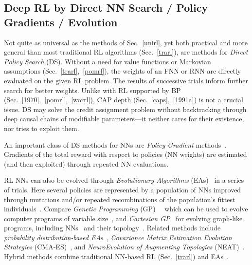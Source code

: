 \documentclass[letterpaper]{article}
\begin{document}
\begin{CJK*}{UTF8}{gbsn}
\subsection{Deep RL by Direct NN Search / Policy Gradients / Evolution}
\label{evorl}

Not quite as universal as the methods of Sec.~\ref{unirl},
yet both practical and more general than most traditional RL algorithms (Sec.~\ref{trarl}), are 
methods for {\em Direct Policy Search} (DS).
Without a need for value functions or Markovian assumptions (Sec.~\ref{trarl},~\ref{pomrl}), 
the weights of an FNN or RNN are directly evaluated on the given RL problem.
The results of successive trials inform further search for better weights.
Unlike with RL supported by BP (Sec.~\ref{1970},~\ref{pomrl},~\ref{worrl}),
CAP depth (Sec.~\ref{caps},~\ref{1991a}) is not a crucial issue.
DS may solve the credit assignment problem without 
backtracking through deep causal chains of 
modifiable parameters---it neither cares for their existence,
nor tries to exploit them.


An important class of DS methods for NNs are 
{\em Policy Gradient}
methods~\citep{Williams:86,Williams:88,Williams:92,Sutton:99,baxter2001,aberdeenthesis,ghavamzadehICML03,stoneICRA04,wierstraCEC08,rueckstiess2008b,peters2008neuralnetworks,peters2008neurocomputing,sehnke2009parameter,gruettner2010multi,wierstra2010,peters2010,grondman2012,heess2012}.
Gradients of the total reward with respect to policies (NN weights) are 
estimated (and then exploited) through repeated NN evaluations.

RL NNs can also be evolved through
{\em Evolutionary Algorithms} (EAs)~\citep{Rechenberg:71,Schwefel:74,Holland:75,Fogel:66,goldberg:gabook89}
 in a series of trials.
Here several policies are represented by a population
of NNs improved through mutations and/or
repeated recombinations of the population's fittest individuals~\citep[e.g.,][]{montana1989,fogel1990,maniezzo1994,happel1994,nolfi1994}.
Compare {\em Genetic Programming} (GP)~\citep{Cramer:85}~\citep[see also][]{smith80} which
can be used to evolve computer programs of variable size~\citep{gp87,Koza:92},
and {\em Cartesian GP}~\citep{miller2000,miller2009} 
for evolving graph-like programs,
including NNs~\citep{khan2010} and their topology~\citep{turner2013}.
Related methods include 
{\em probability distribution-based EAs}~\citep{Baluja:94,saravanan:ieeeexpert95,Salustowicz:97ecj,Larraanaga2001}, 
{\em Covariance Matrix Estimation Evolution Strategies} (CMA-ES)~\citep{hansenCMA,hansen2003,igel:cec03,heidrich-meisner:09},
and {\em NeuroEvolution of Augmenting Topologies} (NEAT)~\citep{stanley:ec02}.
Hybrid methods combine traditional NN-based RL (Sec.~\ref{trarl}) and EAs~\citep[e.g.,][]{whiteson2006}.



\end{CJK*}
\end{document}
